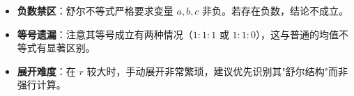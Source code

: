 \begin{trapbox}
\begin{itemize}
    \item \textbf{负数禁区}：舒尔不等式严格要求变量 $a, b, c$ 非负。若存在负数，结论不成立。
    \item \textbf{等号遗漏}：注意其等号成立有两种情况（$1:1:1$ 或 $1:1:0$），这与普通的均值不等式有显著区别。
    \item \textbf{展开难度}：在 $r$ 较大时，手动展开非常繁琐，建议优先识别其"舒尔结构"而非强行计算。
\end{itemize}
\end{trapbox}